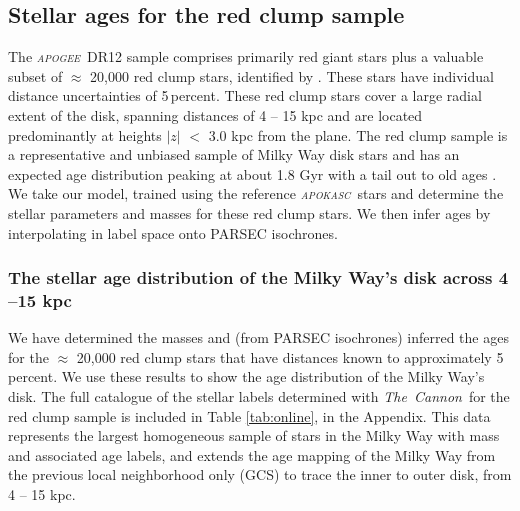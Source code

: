 \documentclass[12pt, preprint]{aastex}
\newcommand{\project}[1]{\textsl{#1}}
\newcommand{\tc}{\project{The~Cannon}}
\newcommand{\apogee}{\project{\textsc{apogee}}}
\newcommand{\apokasc}{\project{\textsc{apokasc}}}
\newcommand{\teff}{\mbox{$\rm T_{eff}$}}
\newcommand{\feh}{\mbox{$\rm [Fe/H]$}}
\newcommand{\alphafe}{\mbox{$\rm [\alpha/Fe]$}}
\newcommand{\logg}{\mbox{$\rm \log g$}}
\begin{document}



\subsection{Stellar ages for the red clump sample}

The \apogee\ DR12 sample comprises primarily red giant stars plus a valuable subset of  $\approx$ 20,000 red clump stars, identified by \citet{Bovy2014}.  These stars have individual distance uncertainties of 5\,percent. These red clump stars cover a large radial extent of the disk, spanning distances of 4 -- 15 kpc and are located predominantly at heights $|z|$ $<$ 3.0 kpc from the plane. The red clump sample is a representative and unbiased sample of Milky Way disk stars and has an expected age distribution peaking at about 1.8 Gyr with a tail out to old ages \citep[see Figure 15 of][]{Bovy2014}. We take our model, trained using the reference \apokasc\ stars and determine the stellar parameters and masses for these red clump stars. We then infer ages by interpolating in label space onto PARSEC isochrones.



\subsubsection{The stellar age distribution of the Milky Way's disk across 4 --15 kpc}

We have determined the masses and (from PARSEC isochrones) inferred the ages for the $\approx$ 20,000 red clump stars that have distances known to approximately 5 percent. We use these results to show the age distribution of the Milky Way's disk. The full catalogue of the stellar labels determined with \tc\ for the red clump sample is included in Table \ref{tab:online}, in the Appendix. This data represents the largest homogeneous sample of stars in the Milky Way with mass and associated age labels, and extends the age mapping of the Milky Way from the previous local neighborhood only (GCS) to trace the inner to outer disk, from 4 -- 15 kpc.  
\end{document}
